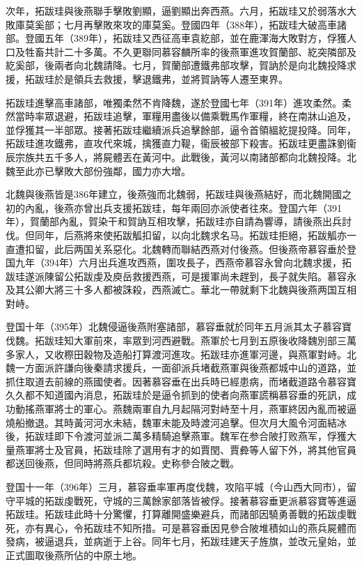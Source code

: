次年，拓跋珪與後燕聯手擊敗劉顯，逼劉顯出奔西燕。六月，拓跋珪又於弱落水大敗庫莫奚部；七月再擊敗來攻的庫莫奚。登國四年（388年），拓跋珪大破高車諸部。登國五年（389年），拓跋珪又西征高車袁紇部，並在鹿渾海大敗對方，俘獲人口及牲畜共計二十多萬。不久更聯同慕容麟所率的後燕軍進攻賀蘭部、紇突隣部及紇奚部，後兩者向北魏請降。七月，賀蘭部遭鐵弗部攻擊，賀訥於是向北魏投降求援，拓跋珪於是領兵去救援，擊退鐵弗，並將賀訥等人遷至東界。

拓跋珪進擊高車諸部，唯獨柔然不肯降魏，遂於登國七年（391年）進攻柔然。柔然當時率眾退避，拓跋珪追擊，軍糧用盡後以備乘戰馬作軍糧，終在南牀山追及，並俘獲其一半部眾。接著拓跋珪繼續派兵追擊餘部，逼令首領縕紇提投降。同年，拓跋珪進攻鐵弗，直攻代來城，擒獲直力鞮，衞辰被部下殺害。拓跋珪更盡誅劉衞辰宗族共五千多人，將屍體丟在黃河中。此戰後，黃河以南諸部都向北魏投降。北魏至此亦已擊敗大部份強鄰，國力亦大增。

北魏與後燕皆是386年建立，後燕強而北魏弱，拓跋珪與後燕結好，而北魏開國之初的內亂，後燕亦曾出兵支援拓跋珪，每年兩回亦派使者往來。登国六年（391年），賀蘭部內亂，賀染干和賀訥互相攻擊，拓跋珪亦自請為響導，請後燕出兵討伐。但同年，后燕將來使拓跋觚扣留，以向北魏求名马。拓跋珪拒絕，拓跋觚亦一直遭扣留，此后两国关系惡化。北魏轉而聯結西燕对付後燕。但後燕帝慕容垂於登国九年（394年）六月出兵進攻西燕，圍攻長子，西燕帝慕容永曾向北魏求援，拓跋珪遂派陳留公拓跋虔及庾岳救援西燕，可是援軍尚未趕到，長子就失陷。慕容永及其公卿大將三十多人都被誅殺，西燕滅亡。華北一帶就剩下北魏與後燕两国互相對峙。

登国十年（395年）北魏侵逼後燕附塞諸部，慕容垂就於同年五月派其太子慕容寶伐魏。拓跋珪知大軍前來，率眾到河西避戰。燕軍於七月到五原後收降魏別部三萬多家人，又收穄田穀物及造船打算渡河進攻。拓跋珪亦進軍河邊，與燕軍對峙。北魏一方面派許謙向後秦請求援兵，一面卻派兵堵截燕軍與後燕都城中山的道路，並抓住取道去前線的燕國使者。因著慕容垂在出兵時已經患病，而堵截道路令慕容寶久久都不知道國內消息，拓跋珪於是逼令抓到的使者向燕軍謊稱慕容垂的死訊，成功動搖燕軍將士的軍心。燕魏兩軍自九月起隔河對峙至十月，燕軍終因內亂而被逼燒船撤退。其時黃河河水未結，魏軍未能及時渡河追擊。但次月大風令河面結冰後，拓跋珪即下令渡河並派二萬多精騎追擊燕軍。魏军在参合陂打败燕军，俘獲大量燕軍將士及官員，拓跋珪除了選用有才的如賈閏、賈彜等人留下外，將其他官員都送回後燕，但同時將燕兵都坑殺。史称參合陂之戰。

登国十一年（396年）三月，慕容垂率軍再度伐魏，攻陷平城（今山西大同市），留守平城的拓跋虔戰死，守城的三萬餘家部落皆被俘。接著慕容垂更派慕容寶等進逼拓跋珪。拓跋珪此時十分驚懼，打算離開盛樂避兵，而諸部因驍勇善戰的拓跋虔戰死，亦有異心，令拓跋珪不知所措。可是慕容垂因見參合陂堆積如山的燕兵屍體而發病，被逼退兵，並病逝于上谷。同年七月，拓跋珪建天子旌旗，並改元皇始，並正式圖取後燕所佔的中原土地。

